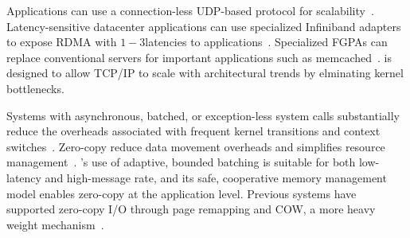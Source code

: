  Applications can
use a connection-less UDP-based protocol for
scalability~\cite{nishtala2013scaling}.  Latency-sensitive datacenter
applications can use specialized Infiniband adapters to expose RDMA
with $1-3$\microsecond latencies to
applications~\cite{DBLP:conf/sosp/OngaroRSOR11,Jose:2011:MDH,mitchell:rdma,dragojevic14farm}.
Specialized FGPAs can replace conventional servers for important
applications such as
memcached~\cite{DBLP:conf/fpga/ChalamalasettiLWARM13,HPHA:Tanaka:2014,179402}.
\ix is designed to allow TCP/IP to scale with architectural trends by
elminating kernel bottlenecks.


Systems with asynchronous, batched, or exception-less system calls
substantially reduce the overheads associated with frequent kernel
transitions and context switches~\cite{
  soares2010flexsc,han2012megapipe,rizzo2012netmap,jeong2014mtcp}.
Zero-copy reduce data movement overheads and simplifies resource
management~\cite{DBLP:journals/tocs/PaiDZ00}.  \ix's use of adaptive,
bounded batching is suitable for both low-latency and high-message
rate, and its safe, cooperative memory management model enables
zero-copy at the application level. Previous systems have supported
zero-copy I/O through page remapping and COW, a more heavy weight mechanism~\cite{solaris_zc}.


